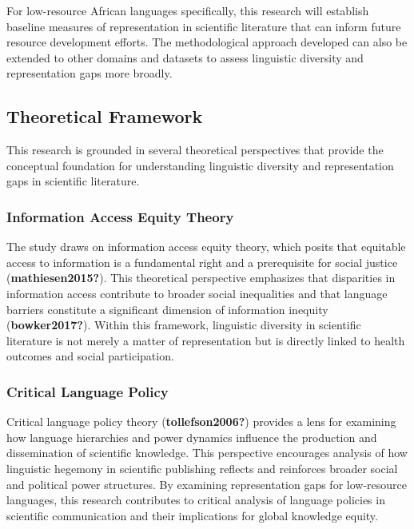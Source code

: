 \documentclass[
]{article}
\begin{document}
For low-resource African languages specifically, this research will
establish baseline measures of representation in scientific literature
that can inform future resource development efforts. The methodological
approach developed can also be extended to other domains and datasets to
assess linguistic diversity and representation gaps more broadly.

\subsection{Theoretical Framework}\label{theoretical-framework}

This research is grounded in several theoretical perspectives that
provide the conceptual foundation for understanding linguistic diversity
and representation gaps in scientific literature.

\subsubsection{Information Access Equity
Theory}\label{information-access-equity-theory}

The study draws on information access equity theory, which posits that
equitable access to information is a fundamental right and a
prerequisite for social justice (\textbf{mathiesen2015?}). This
theoretical perspective emphasizes that disparities in information
access contribute to broader social inequalities and that language
barriers constitute a significant dimension of information inequity
(\textbf{bowker2017?}). Within this framework, linguistic diversity in
scientific literature is not merely a matter of representation but is
directly linked to health outcomes and social participation.

\subsubsection{Critical Language Policy}\label{critical-language-policy}

Critical language policy theory (\textbf{tollefson2006?}) provides a
lens for examining how language hierarchies and power dynamics influence
the production and dissemination of scientific knowledge. This
perspective encourages analysis of how linguistic hegemony in scientific
publishing reflects and reinforces broader social and political power
structures. By examining representation gaps for low-resource languages,
this research contributes to critical analysis of language policies in
scientific communication and their implications for global knowledge
equity.
\end{document}
